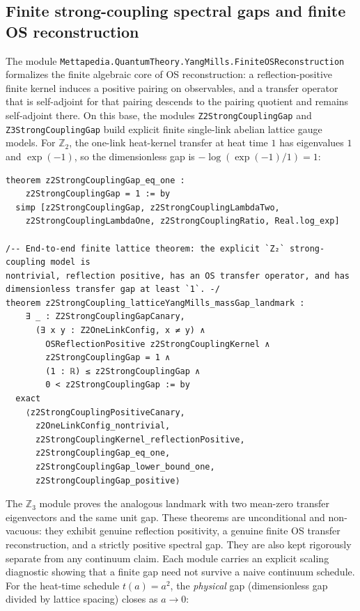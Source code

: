 \documentclass[11pt]{article}
\theoremstyle{definition}
\begin{document}
\subsection{Finite strong-coupling spectral gaps and finite OS reconstruction}

The module \texttt{Mettapedia.QuantumTheory.YangMills.FiniteOSReconstruction}
formalizes the finite algebraic core of OS reconstruction: a reflection-positive
finite kernel induces a positive pairing on observables, and a transfer operator
that is self-adjoint for that pairing descends to the pairing quotient and
remains self-adjoint there. On this base, the modules
\texttt{Z2StrongCouplingGap} and \texttt{Z3StrongCouplingGap} build explicit
finite single-link abelian lattice gauge models. For $\mathbb{Z}_2$, the
one-link heat-kernel transfer at heat time $1$ has eigenvalues $1$ and
$\exp(-1)$, so the dimensionless gap is $-\log(\exp(-1)/1)=1$:

\begin{lstlisting}
theorem z2StrongCouplingGap_eq_one :
    z2StrongCouplingGap = 1 := by
  simp [z2StrongCouplingGap, z2StrongCouplingLambdaTwo,
    z2StrongCouplingLambdaOne, z2StrongCouplingRatio, Real.log_exp]

/-- End-to-end finite lattice theorem: the explicit `Z₂` strong-coupling model is
nontrivial, reflection positive, has an OS transfer operator, and has
dimensionless transfer gap at least `1`. -/
theorem z2StrongCoupling_latticeYangMills_massGap_landmark :
    ∃ _ : Z2StrongCouplingGapCanary,
      (∃ x y : Z2OneLinkConfig, x ≠ y) ∧
        OSReflectionPositive z2StrongCouplingKernel ∧
        z2StrongCouplingGap = 1 ∧
        (1 : ℝ) ≤ z2StrongCouplingGap ∧
        0 < z2StrongCouplingGap := by
  exact
    ⟨z2StrongCouplingPositiveCanary,
      z2OneLinkConfig_nontrivial,
      z2StrongCouplingKernel_reflectionPositive,
      z2StrongCouplingGap_eq_one,
      z2StrongCouplingGap_lower_bound_one,
      z2StrongCouplingGap_positive⟩
\end{lstlisting}

The $\mathbb{Z}_3$ module proves the analogous landmark with two mean-zero
transfer eigenvectors and the same unit gap. These theorems are unconditional
and non-vacuous: they exhibit genuine reflection positivity, a genuine finite OS
transfer reconstruction, and a strictly positive spectral gap. They are also
kept rigorously separate from any continuum claim. Each module carries an
explicit scaling diagnostic showing that a finite gap need not survive a naive
continuum schedule. For the heat-time schedule $t(a)=a^2$, the \emph{physical}
gap (dimensionless gap divided by lattice spacing) closes as $a\to0$:
\end{document}
